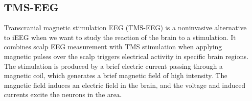 \subsection{TMS-EEG}

Transcranial magnetic stimulation EEG (TMS-EEG) is a noninvasive alternative to iEEG when we want to study the reaction of the brain to a stimulation. It combines scalp EEG measurement with TMS stimulation when applying magnetic pulses over the scalp triggers electrical activity in specific brain regions. The stimulation is produced by a brief electric current passing through a magnetic coil, which generates a brief magnetic field of high intensity. The magnetic field induces an electric field in the brain, and the voltage and induced currents excite the neurons in the area. \cite{hallett_transcranial_2007}



